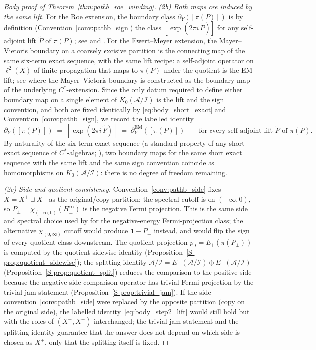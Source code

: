 \documentclass[11pt]{article}
\numberwithin{equation}{section}
\theoremstyle{definition}
\theoremstyle{remark}
\newcommand{\Id}{\mathbf{1}}
\begin{document}
\begin{proof}[Body proof of Theorem~\ref{thm:pathb_roe_winding}]
\smallskip
\emph{(2b) Both maps are induced by the same lift.} For the Roe extension, the boundary class
\(\partial_Y([\pi(P)])\) is by definition (Convention~\ref{conv:pathb_sign}) the class
\([\exp(2\pi i\,\tilde P)]\) for any self-adjoint lift \(\tilde P\) of \(\pi(P)\); see
\cite[\S6]{HigsonRoeI} and \cite{RoeLectures}. For the Ewert--Meyer extension, the
Mayer--Vietoris boundary on a coarsely excisive partition is the connecting map of the same
six-term exact sequence, with the same lift recipe: a self-adjoint operator on \(\ell^2(X)\) of
finite propagation that maps to \(\pi(P)\) under the quotient is the EM lift; see
\cite[\S3]{EwertMeyer2019} where the Mayer--Vietoris boundary is constructed as the boundary
map of the underlying \(C^*\)-extension. Since the only datum required to define either
boundary map on a single element of \(K_0(\mathcal A/\mathcal I)\) is the lift and the sign
convention, and both are fixed identically by \eqref{eq:body_short_exact} and
Convention~\ref{conv:pathb_sign}, we record the labelled identity
\begin{equation}\label{eq:body_step2_lift}
\partial_Y([\pi(P)])\;=\;[\exp(2\pi i\,\tilde P)]\;=\;\partial^{\mathrm{EM}}_Y([\pi(P)])
\qquad\text{for every self-adjoint lift }\tilde P\text{ of }\pi(P).
\end{equation}
By naturality of the six-term exact sequence (a standard property of any short exact sequence
of \(C^*\)-algebras; \cite[\S 8]{BlackadarKTheory}), two boundary maps for the same short exact
sequence with the same lift and the same sign convention coincide as homomorphisms on
\(K_0(\mathcal A/\mathcal I)\): there is no degree of freedom remaining.

\smallskip
\emph{(2c) Side and quotient consistency.} Convention~\ref{conv:pathb_side} fixes
\(X=X^+\sqcup X^-\) as the original/copy partition; the spectral cutoff is on
\((-\infty,0)\), so \(P_\pm=\chi_{(-\infty,0)}(H_\pm^\infty)\) is the negative Fermi projection.
This is the same side and spectral choice used by \cite{EwertMeyer2019} for the negative-energy
Fermi-projection class; the alternative \(\chi_{(0,\infty)}\) cutoff would produce \(\Id-P_\pm\)
instead, and would flip the sign of every quotient class downstream. The quotient
projection \(p_J=E_+(\pi(P_\pm))\) is computed by the quotient-sidewise identity
(Proposition~\ref{S-prop:quotient_sidewise}); the splitting identity
\(\mathcal A/\mathcal I=E_+(\mathcal A/\mathcal I)\oplus E_-(\mathcal A/\mathcal I)\)
(Proposition~\ref{S-prop:quotient_split}) reduces the comparison to the positive side because
the negative-side comparison operator has trivial Fermi projection by the trivial-jam
statement (Proposition~\ref{S-prop:trivial_jam}). If the side convention~\ref{conv:pathb_side}
were replaced by the opposite partition (copy on the original side), the labelled
identity~\eqref{eq:body_step2_lift} would still hold but with the roles of
\((X^+,X^-)\) interchanged; the trivial-jam statement and the splitting identity guarantee that
the answer does not depend on which side is chosen as \(X^+\), only that the splitting itself
is fixed.


\end{proof}
\end{document}
